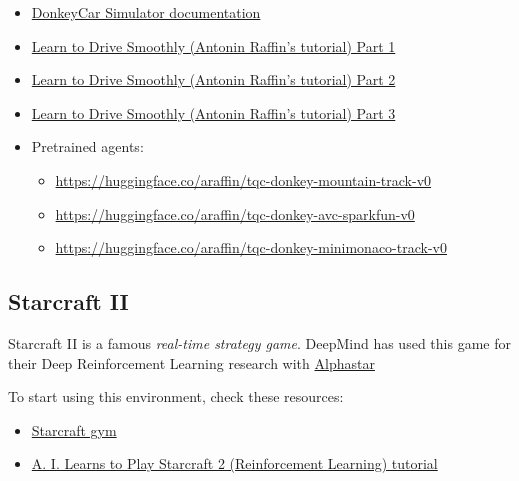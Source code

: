 \documentclass[11pt,a4paper]{article}
\begin{document}
\begin{itemize}
\item
  \href{https://docs.donkeycar.com/guide/deep_learning/simulator/}{DonkeyCar Simulator documentation}
\item
  \href{https://www.youtube.com/watch?v=ngK33h00iBE}{Learn to Drive Smoothly (Antonin Raffin's tutorial) Part 1}
\item
  \href{https://www.youtube.com/watch?v=DUqssFvcSOY}{Learn to Drive Smoothly (Antonin Raffin's tutorial) Part 2}
\item
  \href{https://www.youtube.com/watch?v=v8j2bpcE4Rg}{Learn to Drive Smoothly (Antonin Raffin's tutorial) Part 3}
\item
  Pretrained agents:

  \begin{itemize}
  \tightlist
  \item
    \url{https://huggingface.co/araffin/tqc-donkey-mountain-track-v0}
  \item
    \url{https://huggingface.co/araffin/tqc-donkey-avc-sparkfun-v0}
  \item
    \url{https://huggingface.co/araffin/tqc-donkey-minimonaco-track-v0}
  \end{itemize}
\end{itemize}

\subsection{Starcraft II}\label{starcraft-ii}


Starcraft II is a famous \emph{real-time strategy game}. DeepMind has used this game for their Deep Reinforcement Learning research with \href{https://www.deepmind.com/blog/alphastar-mastering-the-real-time-strategy-game-starcraft-ii}{Alphastar}

To start using this environment, check these resources:

\begin{itemize}
\item
  \href{http://starcraftgym.com/}{Starcraft gym}
\item
  \href{https://www.youtube.com/watch?v=q59wap1ELQ4}{A. I. Learns to Play Starcraft 2 (Reinforcement Learning) tutorial}
\end{itemize}
\end{document}
